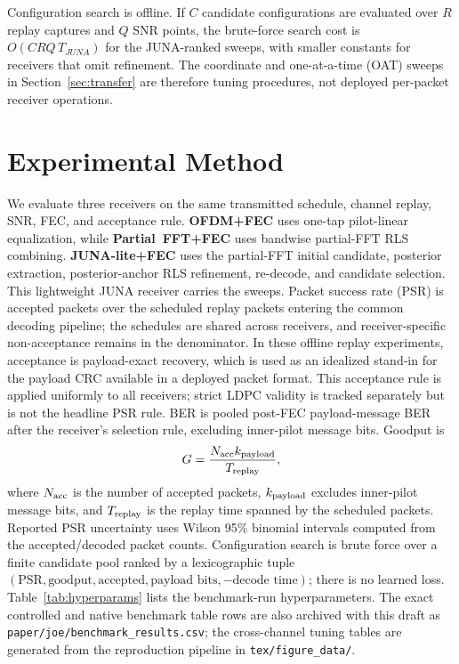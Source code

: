 \documentclass[journal]{IEEEtran}
\newcommand{\juna}{JUNA}
\newcommand{\junalite}{JUNA-lite}
\begin{document}
Configuration search is offline. If $C$ candidate configurations are evaluated
over $R$ replay captures and $Q$ SNR points, the brute-force search cost is
$O(CRQ\,T_{\juna})$ for the JUNA-ranked sweeps, with smaller constants for
receivers that omit refinement. The coordinate and one-at-a-time (OAT) sweeps in
Section~\ref{sec:transfer} are therefore tuning procedures, not deployed
per-packet receiver operations.

\section{Experimental Method}\label{sec:method}
We evaluate three receivers on the same transmitted schedule, channel replay,
SNR, FEC, and acceptance rule. \textbf{OFDM+FEC} uses one-tap pilot-linear
equalization, while \textbf{Partial~FFT+FEC} uses bandwise partial-FFT RLS
combining. \textbf{\junalite{}+FEC} uses the partial-FFT initial candidate, posterior
extraction, posterior-anchor RLS refinement, re-decode, and candidate selection.
This lightweight \juna{} receiver carries the sweeps. Packet success rate (PSR) is
accepted packets over the scheduled replay packets entering the common decoding
pipeline; the schedules are shared across receivers, and receiver-specific
non-acceptance remains in the denominator. In these offline replay experiments,
acceptance is payload-exact recovery, which is used as an idealized stand-in for
the payload CRC available in a deployed packet format. This acceptance rule is
applied uniformly to all receivers; strict LDPC validity is tracked separately but
is not the headline PSR rule. BER is pooled post-FEC payload-message BER after
the receiver's selection rule, excluding inner-pilot message bits. Goodput is
\begin{equation}
  G=\frac{N_{\rm acc}k_{\rm payload}}{T_{\rm replay}},
  \label{eq:goodput}
\end{equation}
where $N_{\rm acc}$ is the number of accepted packets, $k_{\rm payload}$ excludes
inner-pilot message bits, and $T_{\rm replay}$ is the replay time spanned by the
scheduled packets. Reported PSR uncertainty uses Wilson 95\% binomial intervals
computed from the accepted/decoded packet counts.
Configuration search is brute force over a finite candidate pool ranked by a
lexicographic tuple
$(\mathrm{PSR},\text{goodput},\text{accepted},\text{payload bits},
-\text{decode time})$; there is no learned loss. Table~\ref{tab:hyperparams}
lists the benchmark-run hyperparameters. The exact controlled and native
benchmark table rows are also archived with this draft as
\texttt{paper/joe/benchmark\_results.csv}; the cross-channel tuning tables are
generated from the reproduction pipeline in \texttt{tex/figure\_data/}.
\end{document}
